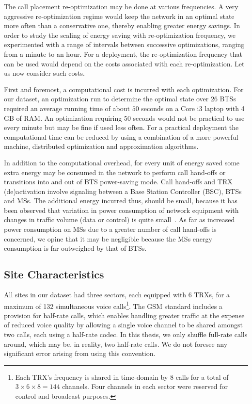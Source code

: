 The call placement re-optimization may be done at various frequencies. A very aggressive re-optimization regime would keep the network in an optimal state more often than a conservative one, thereby enabling greater energy savings. In order to study the scaling of energy saving with re-optimization frequency, we experimented with a range of intervals between successive optimizations, ranging from a minute to an hour. For a deployment, the re-optimization frequency that can be used would depend on the costs associated with each re-optimization. Let us now consider such costs.

First and foremost, a computational cost is incurred with each optimization. For our dataset, an optimization run to determine the optimal state over $26$ BTSs required an average running time of about $50$ seconds on a Core i3 laptop with 4 GB of RAM. An optimization requiring $50$ seconds would not be practical to use every minute but may be fine if used less often. For a practical deployment the computational time can be reduced by using a combination of a more powerful machine, distributed optimization and approximation algorithms. 

In addition to the computational overhead, for every unit of energy saved some extra energy may be consumed in the network to perform call hand-offs or transitions into and out of BTS power-saving mode. Call hand-offs and TRX (de)activation involve signaling between a Base Station Controller (BSC), BTSs and MSs. The additional energy incurred thus, should be small, because it has been observed that variation in power consumption of network equipment with changes in traffic volume (data or control) is quite small~\cite{Chabarek08powerawareness}. As far as increased power consumption on MSs due to a greater number of call hand-offs is concerned, we opine that it may be negligible because the MSs energy consumption is far outweighed by that of BTSs.

\subsection{Site Characteristics}
\label{subsec:case2:experiments:sitetypes} All sites in our dataset had three sectors, each equipped with 6 TRXs, for a maximum of 132 simultaneous voice calls\footnote[1]{Each TRX's frequency is shared in time-domain  by 8 calls for  a total of $3\times6\times8=144$ channels. Four channels in each sector were reserved for control and broadcast purposes.}. The GSM standard includes a provision for half-rate calls, which enables handling greater traffic at the expense of reduced voice quality by allowing a single voice channel to be shared amongst two calls, each using a half-rate codec. In this thesis, we only shuffle full-rate calls around, which may be, in reality, two half-rate calls. We do not foresee any significant error arising from using this convention.

